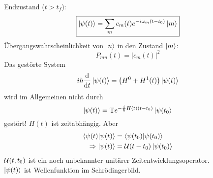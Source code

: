	Endzustand ($t>t_f$):
		\begin{equation*}
			\boxed{ \ket{\psi(t)} = 
			\sum_m c_m(t) e^{-i \omega_m (t-t_0)} \ket{m}
			}
		\end{equation*}
	Übergangswahrscheinlichkeit von $\ket{n}$ in den Zustand $\ket{m}$:
		\begin{equation*}
			\boxed{P_{mn} (t) = |c_m(t)|^2}
		\end{equation*}
	Das gestörte System
		\begin{equation*}
			i \hbar \frac{\mathrm{d}}{\mathrm{d} t} \ket{\psi(t)}
			= \left( H^0 + H^1(t) \right) \ket{\psi(t)}
		\end{equation*}
	wird im Allgemeinen nicht durch
		\begin{equation*}
			\ket{\psi(t)} = \text{T} e^{-\frac{i}{\hbar} H(t) (t-t_0)} \ket{\psi(t_0}
		\end{equation*}
	gestört! $H(t)$ ist zeitabhängig.
	Aber 
		\begin{align*}
			\braket{\psi(t) | \psi(t)} &= \braket{\psi(t_0) | \psi(t_0)} \\
			\Rightarrow \ket{\psi(t)} &= \mathcal{U}(t-t_0) \ket{\psi(t_0)}
		\end{align*}
	$\mathcal{U}(t,t_0)$ ist ein noch unbekannter unitärer Zeitentwicklungsoperator.\\
	$\ket{\psi(t)}$ ist Wellenfunktion im Schrödingerbild.
	
